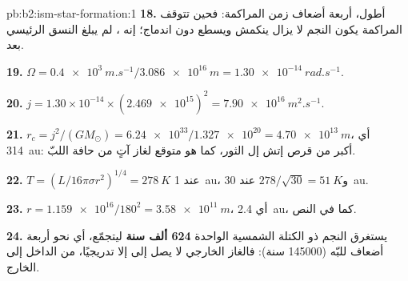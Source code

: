 \begin{solution}{pb:b2:ism-star-formation:1}
\textbf{18.} أطول، أربعة أضعاف زمن المراكمة: فحين تتوقف المراكمة يكون النجم
لا يزال ينكمش ويسطع دون اندماج؛ إنه ، لم يبلغ النسق
الرئيسي بعد.

\textbf{19.} $\Omega = \qty{0.4e3}{m.s^{-1}}/\qty{3.086e16}{m} = \qty{1.30e-14}{rad.s^{-1}}$.

\textbf{20.} $j = 1.30\times10^{-14}\times(\num{2.469e15})^2 = \qty{7.90e16}{m^2.s^{-1}}$.

\textbf{21.} $r_c = j^2/(GM_\odot) = \num{6.24e33}/\num{1.327e20} = \qty{4.70e13}{m}$، أي
\qty{314}{au}: أكبر من قرص إتش إل الثور، كما هو متوقع لغاز آتٍ من حافة
اللبّ.

\textbf{22.} $T = (L/16\pi\sigma r^2)^{1/4} = \qty{278}{K}$ عند \qty{1}{au}،
و$278/\sqrt{30} = \qty{51}{K}$ عند \qty{30}{au}.

\textbf{23.} $r = \num{1.159e16}/180^2 = \qty{3.58e11}{m}$، أي \qty{2.4}{au}، كما في النص.

\textbf{24.} يستغرق النجم ذو الكتلة الشمسية الواحدة
\textbf{\qty[text-series-to-math=true]{624}{} ألف سنة} ليتجمّع، أي نحو أربعة
أضعاف  للبّه (\num{145000} سنة): فالغاز الخارجي لا يصل إلى
 إلا تدريجيًا، من الداخل إلى الخارج.
\end{solution}
